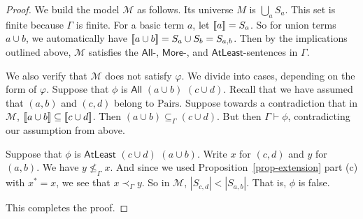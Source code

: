 \documentclass[letterpaper]{article} %
\theoremstyle{definition}
\newcommand{\semantics}[1]{[\![\mbox{\em $ #1 $\/}]\!]}
\newcommand{\Model}{\mathcal{M}}
\newcommand{\set}[1]{\{ #1 \}}
\newcommand{\proves}{\vdash}
\newcommand{\rem}[1]{\relax}
\newcommand{\All}[2]{\mathsf{All}\,\,#1\,\,#2}
\newcommand{\Atleast}[2]{\mathsf{AtLeast}\,\,#1\,\,#2}
\newcommand{\More}[2]{\mathsf{More}\,\,#1\,\,#2}
\newcommand{\AllNoArgs}{\mathsf{All}}
\newcommand{\AtleastNoArgs}{\mathsf{AtLeast}}
\newcommand{\MoreNoArgs}{\mathsf{More}}
\newcommand{\Pairs}{\mbox{Pairs}}
\newcommand{\provsub}{\subseteq_{\Gamma}}
\newcommand{\provle}{\le_{\Gamma}}
\newcommand{\nprovle}{\nleq_{\Gamma}}
\newcommand{\provextended}{\preceq_{\Gamma}}
\newcommand{\provextendedstrict}{\prec_{\Gamma}}
\begin{document}
{\begin{proof}
We build the model $\Model$ as follows.  Its universe $M$ is  $\bigcup_{a} S_a$.
This set is finite because $\Gamma$ is finite.
For a basic term  $a$, let $\semantics{a} = S_{a}$. 
So  for union terms $a\cup b$, we
automatically
have $\semantics{a\cup b} = S_{a} \cup S_{b} = S_{a,b}$.
Then by the implications outlined above, $\Model$ satisfies the $\AllNoArgs$-, $\MoreNoArgs$-, and $\AtleastNoArgs$-sentences in $\Gamma$. 

We also verify that $\Model$ does not satisfy $\varphi$.  We divide into cases, depending on the form of $\varphi$.
 Suppose that $\phi$ is $\All{(a\cup b)}{(c\cup d)}$. 
Recall that we have assumed that $(a,b)$ and $(c,d)$ belong to $\Pairs$.
 Suppose towards a contradiction that
 in $\Model$, $\semantics{a\cup b}\subseteq \semantics{c\cup d}$.
 Then $(a\cup b) \provsub (c\cup d)$.
 But then $\Gamma\proves\phi$, contradicting our assumption from above.

\rem{
Suppose that $\phi$ is $\More{(c \cup d)}{(a\cup b)}$, with the same notational assumptions as above.
Write $x$ for $c\cup d$ and $y$ for $a\cup b$.
We have several cases, in parallel with what we saw when
 we defined $\provextended$ from $\provle$.
 The most interesting is 
 when $\Gamma\proves \Atleast{x}{y}$
 and  $\Gamma\not\proves \Atleast{y}{x}$.
We took $x^*$ to be $a \cup b$
and $y^*$ to be $c\cup d$, thereby 
arranging that $(c,d) \provextended (a,b)$.
Thus $|\semantics{c\cup d}| \leq |\semantics{a\cup b}|$ in our model.
So $\phi$ is false in $\Model$.
}

Suppose that  
 $\phi$ is $\Atleast{(c \cup d)}{(a\cup b)}$.
Write $x$ for $(c,d)$ and $y$ for $(a,b)$.
We have $y \nprovle x$.
And since we used Proposition~\ref{prop-extension} part (c) with $x^* = x$,
we see that $x \provextendedstrict y$.
So in $\Model$, $|S_{c,d}| < |S_{a,b}|$.
That is, $\phi$ is false.

\rem{
\begin{enumerate}%
    \item $\varphi$ is $\More{t}{u}$.
    \item 
    \item 
\end{enumerate}

For (a), since $\Gamma \not \proves \More{t}{u}$, $\Gamma \cup \set{\Atleast{u}{t}}$ is consistent.  So in the previous exposition, we may have instead built a model $\Model^*$ satisfying $\Gamma \cup \set{\Atleast{u}{t}}$.  This model $\Model^*$ does not satisfy $\More{t}{u}$, since $|\semantics{u}| \le |\semantics{t}|$.  Similarly for case (b), not satisfying $\Atleast{t}{u}$ amounts to building a model satisfying $\Gamma \cup \set{\More{u}{t}}$.

Now consider (c).
}

This completes the proof.
\end{proof}
}
\end{document}
